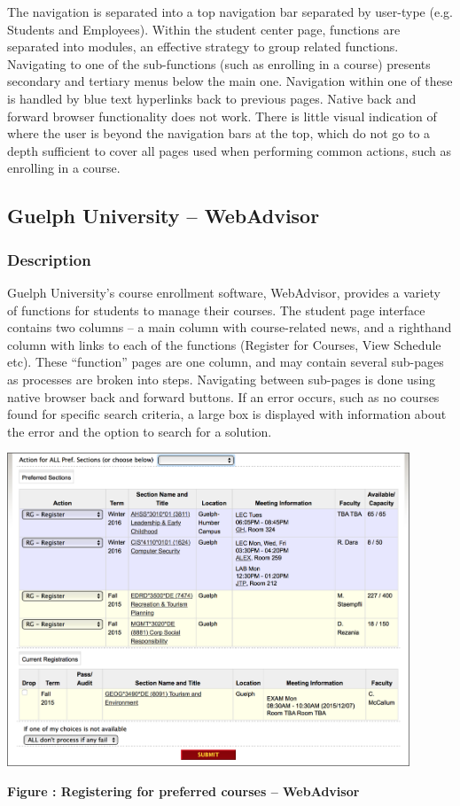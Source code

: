 \documentclass[10pt]{article}
\newenvironment{InlineColumnFigure}
{\par\medskip\noindent\minipage{\linewidth}}
{\endminipage\par\medskip}
\newcommand{\Caption}[1]
{\vspace{-4mm}\fontsize{9}{9}\textbf{Figure \refstepcounter{figCounter} 
\arabic{figCounter}: #1}}
\newcounter{figCounter}
\begin{document}
\begin{multicols}{2}
The navigation is separated into a top navigation bar separated by user-type 
(e.g. Students and Employees). Within the student center page, functions are 
separated into modules, an effective strategy to group related functions. 
Navigating to one of the sub-functions (such as enrolling in a course) presents 
secondary and tertiary menus below the main one. Navigation within one of these 
is handled by blue text hyperlinks back to previous pages. Native back and 
forward browser functionality does not work. There is little visual indication 
of where the user is beyond the navigation bars at the top, which do not go to a 
depth sufficient to cover all pages used when performing common actions, such as 
enrolling in a course.

\subsection*{Guelph University -- WebAdvisor}
\subsubsection*{Description}
Guelph University's course enrollment software, WebAdvisor, provides a variety 
of functions for students to manage their courses. The student page interface 
contains two columns -- a main column with course-related news, and a righthand 
column with links to each of the functions (Register for Courses, View Schedule 
etc). These ``function'' pages are one column, and may contain several sub-pages 
as processes are broken into steps. Navigating between sub-pages is done using 
native browser back and forward buttons. If an error occurs, such as no courses 
found for specific search criteria, a large box is displayed with information 
about the error and the option to search for a solution.\\

\begin{InlineColumnFigure}
\begin{center}
	\includegraphics[width=0.9\textwidth]{WebAdvisorScreen.png}
\end{center}
\Caption{Registering for preferred courses -- WebAdvisor}
\end{InlineColumnFigure}


\end{multicols}
\end{document}
